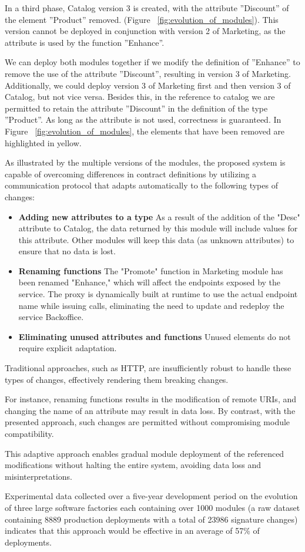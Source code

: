 In a third phase, Catalog version 3 is created, with the attribute ''Discount'' of the element ''Product'' removed.  (Figure ~\ref{fig:evolution_of_modules}).
This version cannot be deployed in conjunction with version 2 of Marketing, as the attribute is used by the function ''Enhance''.

We can deploy both modules together if we modify the definition of ''Enhance'' to remove the use of the attribute ''Discount'', resulting in version 3 of Marketing.
Additionally, we could deploy version 3 of Marketing first and then version 3 of Catalog, but not vice versa.
Besides this, in the reference to catalog we are permitted to retain the attribute ''Discount'' in the definition of the type ''Product''.
As long as the attribute is not used, correctness is guaranteed.
In Figure ~\ref{fig:evolution_of_modules}, the elements that have been removed are highlighted in yellow.

As illustrated by the multiple versions of the modules,
the proposed system is capable of overcoming differences in contract definitions by utilizing a communication protocol
that adapts automatically to the following types of changes:

\begin{itemize}
    \item \textbf{Adding new attributes to a type} As a result of the addition of the "Desc" attribute to Catalog, the data returned by this module will include values for this attribute.
    Other modules will keep this data (as unknown attributes) to ensure that no data is lost.
    \item \textbf{Renaming functions} The "Promote" function in Marketing module has been renamed "Enhance," which will affect the endpoints exposed by the service.
    The proxy is dynamically built at runtime to use the actual endpoint name while issuing calls, eliminating the need to update and redeploy the service Backoffice.
    \item \textbf{Eliminating unused attributes and functions} Unused elements do not require explicit adaptation.
\end{itemize}

Traditional approaches, such as HTTP, are insufficiently robust to handle these types of changes, effectively rendering them breaking changes.

For instance, renaming functions results in the modification of remote URIs, and changing the name of an attribute may result in data loss.
By contrast, with the presented approach, such changes are permitted without compromising module compatibility.

This adaptive approach enables gradual module deployment of the referenced modifications without halting the entire system, avoiding data loss and misinterpretations.

Experimental data \cite{seco2020robust} collected over a five-year development period on the evolution of three large software factories each containing over 1000 modules
(a raw dataset containing 8889 production deployments with a total of 23986 signature changes)
indicates that this approach would be effective in an average of 57\% of deployments.